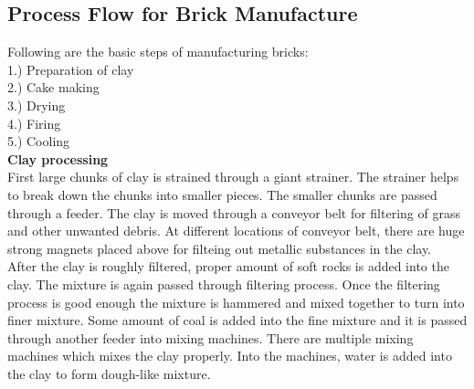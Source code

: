 \subsection{Process Flow for Brick Manufacture}
Following are the basic steps of manufacturing bricks:\\
1.) Preparation of clay\\
2.) Cake making\\
3.) Drying\\
4.) Firing\\
5.) Cooling\\
\newpage
\large{\textbf{Clay processing}}\\
First large chunks of clay is strained through a giant strainer. The strainer helps to break down the chunks into smaller pieces. The smaller chunks are passed through a feeder. The clay is moved through a conveyor belt for filtering of grass and other unwanted debris. At different locations of conveyor belt, there are huge strong magnets placed above for filteing out metallic substances in the clay.\\
After the clay is roughly filtered, proper amount of soft rocks is added into the clay. The mixture is again passed through filtering process. Once the filtering process is good enough the mixture is hammered and mixed together to turn into finer mixture. Some amount of coal is added into the fine mixture and it is passed through another feeder into mixing machines. There are multiple mixing machines which mixes the clay properly. Into the machines, water is added into the clay to form dough-like mixture.